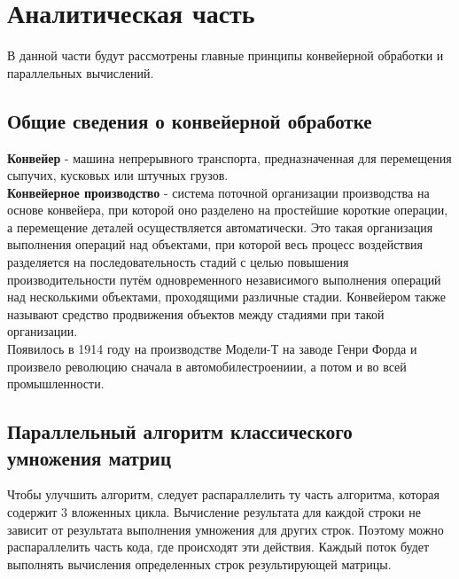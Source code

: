 \documentclass[a4paper, 12pt]{article}
\begin{document}
\section{Аналитическая часть}
\begin{flushleft}
	\hspace*{5mm} В данной части будут рассмотрены главные принципы конвейерной обработки и параллельных вычислений.
	\subsection{Общие сведения о конвейерной обработке}
	\hspace*{5mm} {\bf Конвейер} - машина непрерывного транспорта, предназначенная для перемещения сыпучих, кусковых или штучных грузов.
	\\ \hspace*{5mm} {\bf Конвейерное производство} - система поточной организации производства на основе конвейера, при которой оно разделено на простейшие короткие операции, а перемещение деталей осуществляется автоматически. Это такая организация выполнения операций над объектами, при которой весь процесс воздействия разделяется на последовательность стадий с целью повышения производительности путём одновременного независимого выполнения операций над несколькими объектами, проходящими различные стадии. Конвейером также называют средство продвижения объектов между стадиями при такой организации.\cite{wiki}
	\\ \hspace*{5mm} Появилось в 1914 году на производстве Модели-Т на заводе Генри Форда и произвело революцию сначала в автомобилестроениии, а потом и во всей промышленности.
	\subsection{Параллельный алгоритм классического умножения матриц}
	\hspace*{5mm} Чтобы улучшить алгоритм, следует распараллелить ту часть алгоритма, которая содержит 3 вложенных цикла. Вычисление результата для каждой строки не зависит от результата выполнения умножения для других строк. Поэтому можно распараллелить часть кода, где происходят эти действия. Каждый поток будет выполнять вычисления определенных строк результирующей матрицы.

\end{flushleft}
\end{document}
